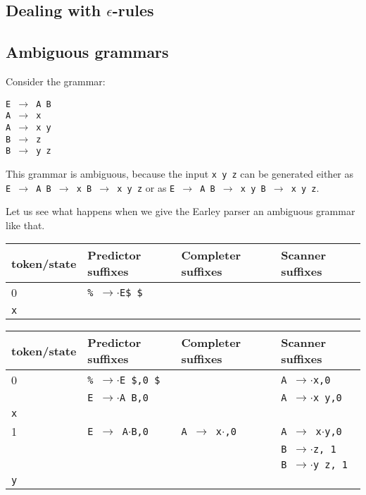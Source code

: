 \documentclass[11pt]{article}
\def\ra{\rightarrow}
\begin{document}
\subsection{Dealing with $\epsilon$-rules}

\cite{DBLP:journals/cj/AycockH02}

\subsection{Ambiguous grammars}

Consider the grammar:

\texttt{E $\ra$ A B\\A $\ra$ x\\A $\ra$ x y\\B $\ra$ z\\B $\ra$ y z} 

This grammar is ambiguous, because the input \texttt{x y z} can be
generated either as \texttt{E $\ra$ A B $\ra$ x B $\ra$ x y z} or as 
\texttt{E $\ra$ A B $\ra$ x y B $\ra$ x y z}.  

Let us see what happens when we give the Earley parser an ambiguous
grammar like that. 

\begin{tabular}{|l|l|l|l|}
\hline
token/state & Predictor suffixes & Completer suffixes & Scanner suffixes\\
\hline
0      & \texttt{\% $\rightarrow$$\cdot$E\$ \$} & & \\
\hline
\texttt{x} &  & &\\
\hline
\end{tabular}

\begin{tabular}{|l|l|l|l|}
\hline
token/state & Predictor suffixes & Completer suffixes & Scanner suffixes\\
\hline
0 & \texttt{\% $\rightarrow$$\cdot$E \$,0 \$} & & \texttt{A $\ra$$\cdot$x,0} \\
  & \texttt{E $\ra$$\cdot$A B,0} & & \texttt{A $\ra$$\cdot$x y,0}\\
\hline
\texttt{x} &  & &\\
\hline
1 & \texttt{E $\ra$ A$\cdot$B,0}& \texttt{A $\ra$ x$\cdot$,0} & \texttt{A $\ra$ x$\cdot$y,0}\\
  & & & \texttt{B $\ra$$\cdot$z, 1}\\
  & & & \texttt{B $\ra$$\cdot$y z, 1}\\
\hline
\texttt{y} &  & &\\
\hline
\end{tabular}
\end{document}
